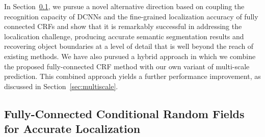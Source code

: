 In Section~\ref{sec:dense-crf}, we pursue a novel alternative direction based
on coupling the recognition capacity of DCNNs and the fine-grained
localization accuracy of fully connected CRFs and show that it is remarkably
successful in addressing the localication challenge, producing accurate
semantic segmentation results and recovering object boundaries at a level of
detail that is well beyond the reach of existing methods.  We have also
pursued a hybrid approach in which we combine the proposed fully-connected CRF
method with our own variant of multi-scale prediction. This combined approach
yields a further performance improvement, as discussed in
Section~\ref{sec:multiscale}.

\subsection{Fully-Connected Conditional Random Fields for Accurate Localization}
\label{sec:dense-crf}

